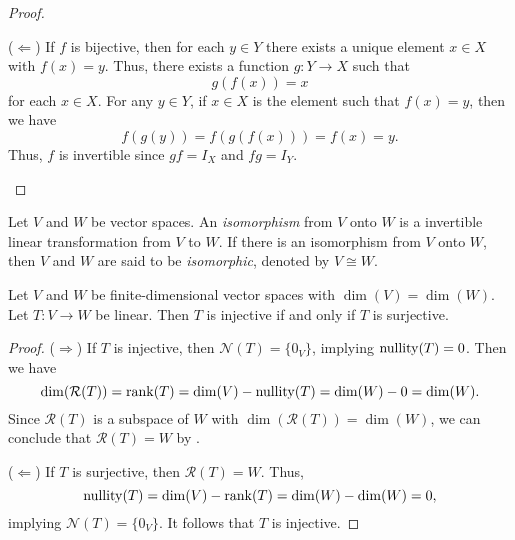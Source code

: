 \begin{proof}
\begin{enumerate}
    ($\Leftarrow$)
    If $f$ is bijective, then for each $y \in Y$ there exists a unique element
    $x \in X$ with $f(x) = y$.
    Thus, there exists a function $g: Y \to X$ such that
    \begin{equation*}
      g(f(x)) = x
    \end{equation*}
    for each $x \in X$.
    For any $y \in Y$, if $x \in X$ is the element such that $f(x) = y$,
    then we have
    \begin{equation*}
      f(g(y)) = f(g(f(x))) = f(x) = y.
    \end{equation*}
    Thus, $f$ is invertible since $gf = I_X$ and $fg = I_Y$. \qedhere
  \end{enumerate}
\end{proof}

\begin{definition}
  \label{def:isomorphism}
  Let $V$ and $W$ be vector spaces.
  An \emph{isomorphism} from $V$ onto $W$ is a invertible linear transformation
  from $V$ to $W$.
  If there is an isomorphism from $V$ onto $W$, then $V$ and $W$ are said to be
  \emph{isomorphic}, denoted by $V \cong W$.
\end{definition}

\begin{lemma}
  \label{lem:same-dimension}
  Let $V$ and $W$ be finite-dimensional vector spaces with $\dim(V) = \dim(W)$.
  Let $T: V \to W$ be linear.
  Then $T$ is injective if and only if $T$ is surjective.
\end{lemma}
\begin{proof}
  ($\Rightarrow$)
  If $T$ is injective, then $\mathcal{N}(T) = \{0_V\}$, implying
  $\operatorname{nullity}(T) = 0$.
  Then we have
  \begin{equation*}
    \dim(\mathcal{R}(T))
    = \operatorname{rank}(T)
    = \dim(V) - \operatorname{nullity}(T)
    = \dim(W) - 0
    = \dim(W).
  \end{equation*}
  Since $\mathcal{R}(T)$ is a subspace of $W$ with
  $\dim(\mathcal{R}(T)) = \dim(W)$, we can conclude that $\mathcal{R}(T) = W$
  by .

  ($\Leftarrow$)
  If $T$ is surjective, then $\mathcal{R}(T) = W$.
  Thus,
  \begin{equation*}
    \operatorname{nullity}(T)
    = \dim(V) - \operatorname{rank}(T)
    = \dim(W) - \dim(W)
    = 0,
  \end{equation*}
  implying $\mathcal{N}(T) = \{0_V\}$.
  It follows that $T$ is injective.
\end{proof}

